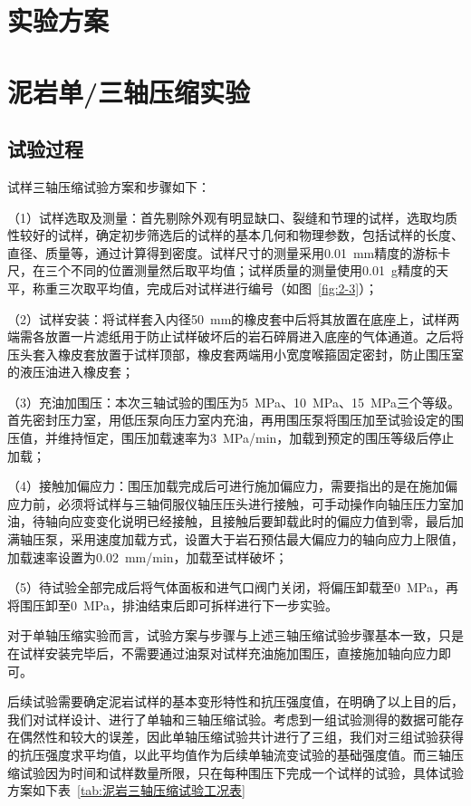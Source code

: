 \section{实验方案}


\section{泥岩单/三轴压缩实验}
\subsection{试验过程}\label{section:试验过程}
试样三轴压缩试验方案和步骤如下：

（1）试样选取及测量：首先剔除外观有明显缺口、裂缝和节理的试样，选取均质性较好的试样，确定初步筛选后的试样的基本几何和物理参数，包括试样的长度、直径、质量等，通过计算得到密度。试样尺寸的测量采用\SI{0.01}{mm}精度的游标卡尺，在三个不同的位置测量然后取平均值；试样质量的测量使用\SI{0.01}{g}精度的天平，称重三次取平均值，完成后对试样进行编号（如图~\ref{fig:2-3}）；

（2）试样安装：将试样套入内径\SI{50}{mm}的橡皮套中后将其放置在底座上，试样两端需各放置一片滤纸用于防止试样破坏后的岩石碎屑进入底座的气体通道。之后将压头套入橡皮套放置于试样顶部，橡皮套两端用小宽度喉箍固定密封，防止围压室的液压油进入橡皮套；

（3）充油加围压：本次三轴试验的围压为\SI{5}{MPa}、\SI{10}{MPa}、\SI{15}{MPa}三个等级。首先密封压力室，用低压泵向压力室内充油，再用围压泵将围压加至试验设定的围压值，并维持恒定，围压加载速率为\SI{3}{MPa/min}，加载到预定的围压等级后停止加载；

（4）接触加偏应力：围压加载完成后可进行施加偏应力，需要指出的是在施加偏应力前，必须将试样与三轴伺服仪轴压压头进行接触，可手动操作向轴压压力室加油，待轴向应变变化说明已经接触，且接触后要卸载此时的偏应力值到零，最后加满轴压泵，采用速度加载方式，设置大于岩石预估最大偏应力的轴向应力上限值，加载速率设置为\SI{0.02}{mm/min}，加载至试样破坏；

（5）待试验全部完成后将气体面板和进气口阀门关闭，将偏压卸载至\SI{0}{MPa}，再将围压卸至\SI{0}{MPa}，排油结束后即可拆样进行下一步实验。

对于单轴压缩实验而言，试验方案与步骤与上述三轴压缩试验步骤基本一致，只是在试样安装完毕后，不需要通过油泵对试样充油施加围压，直接施加轴向应力即可。

后续试验需要确定泥岩试样的基本变形特性和抗压强度值，在明确了以上目的后，
我们对试样设计、进行了单轴和三轴压缩试验。考虑到一组试验测得的数据可能存在偶然性和较大的误差，因此单轴压缩试验共计进行了三组，我们对三组试验获得的抗压强度求平均值，以此平均值作为后续单轴流变试验的基础强度值。而三轴压缩试验因为时间和试样数量所限，只在每种围压下完成一个试样的试验，具体试验方案如下表~\ref{tab:泥岩三轴压缩试验工况表}

